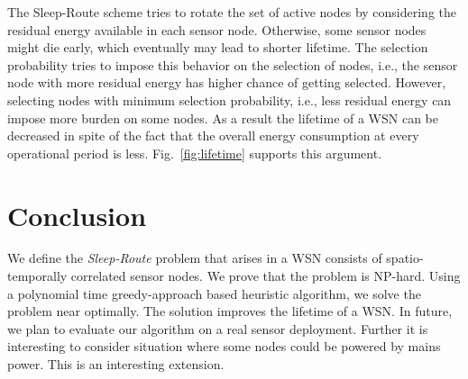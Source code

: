 \documentclass[conference]{IEEEtran}
\begin{document}
The Sleep-Route scheme tries to rotate the set of active nodes by considering the residual energy available in each sensor node. Otherwise, some sensor nodes might die early, which eventually may lead to shorter lifetime. The selection probability tries to impose this behavior on the selection of nodes, i.e., the sensor node with more residual energy has higher chance of getting selected. However, selecting nodes with minimum selection probability, i.e., less residual energy can impose more burden on some nodes. As a result the lifetime of a WSN can be decreased in spite of the fact that the overall energy consumption at every operational period is less. Fig.~\ref{fig:lifetime} supports this argument.
\section{Conclusion}
We define the \emph{Sleep-Route} problem that arises in a WSN consists of spatio-temporally correlated sensor nodes. We prove that the problem is NP-hard. Using a polynomial time greedy-approach based heuristic algorithm, we solve the problem near optimally. The solution improves the lifetime of a WSN. In future, we plan to evaluate our algorithm on a real sensor deployment. Further it is interesting to consider situation where some nodes could be powered by mains power\cite{vazifehdan2012analytical}. This is an interesting extension.











\end{document}
